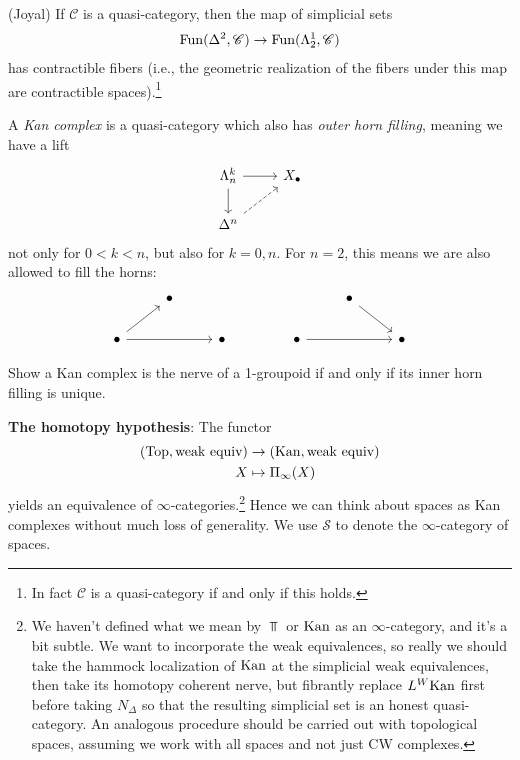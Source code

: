 \documentclass[11pt]{amsart}
\begin{document}
\begin{proposition} (Joyal) If $\mathscr{C}$ is a quasi-category, then the map of simplicial sets
\begin{align*}
    \mathrm{Fun}(\Delta^2,\mathscr{C})\to \mathrm{Fun}(\Lambda_2^1,\mathscr{C})
\end{align*}
has contractible fibers (i.e., the geometric realization of the fibers under this map are contractible spaces).\footnote{In fact $\mathscr{C}$ is a quasi-category if and only if this holds.}

\end{proposition}





\begin{definition} A \textit{Kan complex} is a quasi-category which also has \textit{outer horn filling}, meaning we have a lift
\[ \begin{tikzcd}
    \Lambda^k_n\rar\dar & X_\bullet\\
    \Delta^n\ar[ur,dashed] & 
\end{tikzcd} \]
not only for $0<k<n$, but also for $k=0,n$. For $n=2$, this means we are also allowed to fill the horns:
\[ \begin{tikzcd}
     & \bullet\\
    \bullet\ar[ur]\ar[rr] & & \bullet
\end{tikzcd} \quad\quad \quad\quad  \begin{tikzcd}
    & \bullet\ar[dr] & \\
    \bullet\ar[rr] & & \bullet
\end{tikzcd} \]
\end{definition}



\begin{exercise} Show a Kan complex is the nerve of a 1-groupoid if and only if its inner horn filling is unique.
\end{exercise}

\textbf{The homotopy hypothesis}: The functor
\begin{align*}
    (\mathrm{Top},\text{weak equiv}) &\to (\mathrm{Kan}, \text{weak equiv}) \\
    X &\mapsto \Pi_\infty(X)
\end{align*}
yields an equivalence of $\infty$-categories.\footnote{%
We haven't defined what we mean by $\Top$ or $\mathrm{Kan}$ as an $\infty$-category, and it's a bit subtle. We want to incorporate the weak equivalences, so really we should take the hammock localization of $\mathrm{Kan}$ at the simplicial weak equivalences, then take its homotopy coherent nerve, but fibrantly replace $L^W\mathrm{Kan}$ first before taking $N_\Delta$ so that the resulting simplicial set is an honest quasi-category. An analogous procedure should be carried out with topological spaces, assuming we work with all spaces and not just CW complexes.
}
Hence we can think about spaces as Kan complexes without much loss of generality. We use $\mathcal{S}$ to denote the $\infty$-category of spaces.
\end{document}
